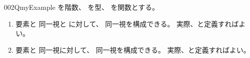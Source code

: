 \documentclass[index]{subfiles}
\begin{document}
\begin{myBlock}{002Q}{myExample}
  を階数、
  を型、
  を関数とする。
  \begin{enumerate}
    \item 要素と
      同一視と
      に対して、
      同一視を構成できる。
      実際、と定義すればよい。
    \item 要素と
      同一視に対して、
      同一視を構成できる。
      実際、と定義すればよい。
  \end{enumerate}
\end{myBlock}
\end{document}
